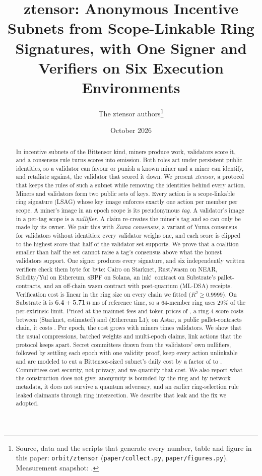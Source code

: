 \documentclass[11pt]{article}
\title{\textbf{ztensor: Anonymous Incentive Subnets from Scope-Linkable Ring Signatures, with One Signer and Verifiers on Six Execution Environments}}
\author{The ztensor authors\thanks{Source, data and the scripts that generate every number, table and figure in this paper: \texttt{orbit/ztensor} (\texttt{paper/collect.py}, \texttt{paper/figures.py}). Measurement snapshot: \snapdate.}}
\date{October 2026}
\theoremstyle{remark}
\begin{document}
\maketitle

\begin{abstract}
In incentive subnets of the Bittensor kind, miners produce work, validators score it, and a consensus rule turns scores into emission. Both roles act under persistent public identities, so a validator can favour or punish a known miner and a miner can identify, and retaliate against, the validator that scored it down. We present \emph{ztensor}, a protocol that keeps the rules of such a subnet while removing the identities behind every action. Miners and validators form two public sets of keys. Every action is a scope-linkable ring signature (LSAG) whose key image enforces exactly one action per member per scope. A miner's image in an epoch scope is its pseudonymous \emph{tag}. A validator's image in a per-tag scope is a \emph{nullifier}. A claim re-creates the miner's tag and so can only be made by its owner. We pair this with \emph{Zuma consensus}, a variant of Yuma consensus for validators without identities: every validator weighs one, and each score is clipped to the highest score that half of the validator set supports. We prove that a coalition smaller than half the set cannot raise a tag's consensus above what the honest validators support. One signer produces every signature, and six independently written verifiers check them byte for byte: Cairo on Starknet, Rust/wasm on NEAR, Solidity/Yul on Ethereum, sBPF on Solana, an ink!\ contract on Substrate's pallet-contracts, and an off-chain wasm contract with post-quantum (ML-DSA) receipts. Verification cost is linear in the ring size on every chain we fitted ($R^2 \ge 0.9999$). On Substrate it is $6.4 + 5.71\,n$\,ms of reference time, so a 64-member ring uses 29\% of the per-extrinsic limit. Priced at the mainnet fees and token prices of \snapdate, a ring-4 score costs between \usdSn{} (Starknet, estimated) and \usdEth{} (Ethereum L1); on Astar, a public pallet-contracts chain, it costs \usdSub. Per epoch, the cost grows with miners times validators. We show that the usual compressions, batched weights and multi-epoch claims, link actions that the protocol keeps apart. Secret committees drawn from the validators' own nullifiers, followed by settling each epoch with one validity proof, keep every action unlinkable and are modeled to cut a Bittensor-sized subnet's daily cost by a factor of \scaleMinRatio{} to \scaleMaxRatio{}. Committees cost security, not privacy, and we quantify that cost. We also report what the construction does not give: anonymity is bounded by the ring and by network metadata, it does not survive a quantum adversary, and an earlier ring-selection rule leaked claimants through ring intersection. We describe that leak and the fix we adopted.
\end{abstract}
\end{document}
